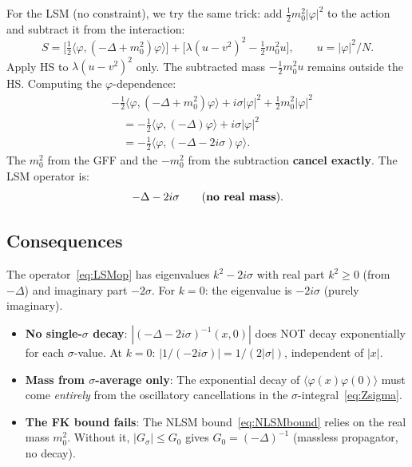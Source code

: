 \documentclass[12pt]{article}
\theoremstyle{definition}
\theoremstyle{remark}
\newcommand{\ph}{\varphi}
\begin{document}
For the LSM (no constraint), we try the same trick: add
$\tfrac{1}{2}m_0^2|\ph|^2$ to the action and subtract it from
the interaction:
\begin{equation}
  S = \bigl[\tfrac{1}{2}\langle\ph,(-\Delta+m_0^2)\ph\rangle\bigr]
    + \bigl[\lambda(u-v^2)^2 - \tfrac{1}{2}m_0^2 u\bigr],
  \qquad u = |\ph|^2/N.
\end{equation}
Apply HS to $\lambda(u-v^2)^2$ only. The subtracted mass
$-\tfrac{1}{2}m_0^2 u$ remains outside the HS. Computing the
$\ph$-dependence:
\begin{align}
  &-\tfrac{1}{2}\langle\ph,(-\Delta+m_0^2)\ph\rangle
    + i\sigma|\ph|^2 + \tfrac{1}{2}m_0^2|\ph|^2 \nonumber\\
  &\quad= -\tfrac{1}{2}\langle\ph,(-\Delta)\ph\rangle + i\sigma|\ph|^2
    \nonumber\\
  &\quad= -\tfrac{1}{2}\langle\ph,(-\Delta - 2i\sigma)\ph\rangle.
\end{align}
The $m_0^2$ from the GFF and the $-m_0^2$ from the subtraction
\textbf{cancel exactly}. The LSM operator is:
\begin{equation}
\label{eq:LSMop}
  -\Delta - 2i\sigma \qquad\text{(\textbf{no real mass})}.
\end{equation}

\subsection{Consequences}

The operator~\eqref{eq:LSMop} has eigenvalues $k^2 - 2i\sigma$
with real part $k^2 \ge 0$ (from $-\Delta$) and imaginary part
$-2\sigma$. For $k = 0$: the eigenvalue is $-2i\sigma$ (purely
imaginary).

\begin{itemize}
\item \textbf{No single-$\sigma$ decay}: $|(-\Delta-2i\sigma)^{-1}(x,0)|$
  does NOT decay exponentially for each $\sigma$-value. At $k=0$:
  $|1/(-2i\sigma)| = 1/(2|\sigma|)$, independent of $|x|$.
\item \textbf{Mass from $\sigma$-average only}: The exponential decay
  of $\langle\ph(x)\ph(0)\rangle$ must come \emph{entirely} from the
  oscillatory cancellations in the $\sigma$-integral~\eqref{eq:Zsigma}.
\item \textbf{The FK bound fails}: The NLSM bound~\eqref{eq:NLSMbound}
  relies on the real mass $m_0^2$. Without it, $|G_\sigma| \le G_0$
  gives $G_0 = (-\Delta)^{-1}$ (massless propagator, no decay).
\end{itemize}
\end{document}
